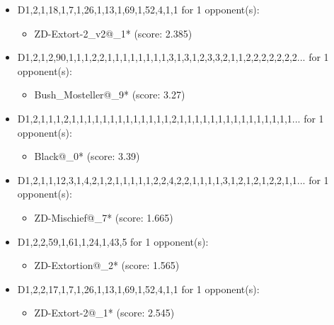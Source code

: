 \begin{appendices}
\begin{itemize}
    \item D1,2,1,18,1,7,1,26,1,13,1,69,1,52,4,1,1 for 1 opponent(s):
    \begin{multicols}{3}
         \begin{itemize}
            \item ZD-Extort-2\_v2@\_1* (score: 2.385)
        \end{itemize}
     \end{multicols}
     
    \item D1,2,1,2,90,1,1,1,2,2,1,1,1,1,1,1,1,1,3,1,3,1,2,3,3,2,1,1,2,2,2,2,2,2,2... for 1 opponent(s):
    \begin{multicols}{3}
         \begin{itemize}
            \item Bush\_Mosteller@\_9* (score: 3.27)
        \end{itemize}
     \end{multicols}
     
    \item D1,2,1,1,1,2,1,1,1,1,1,1,1,1,1,1,1,1,1,2,1,1,1,1,1,1,1,1,1,1,1,1,1,1,1... for 1 opponent(s):
    \begin{multicols}{3}
         \begin{itemize}
            \item Black@\_0* (score: 3.39)
        \end{itemize}
     \end{multicols}
     
    \item D1,2,1,1,12,3,1,4,2,1,2,1,1,1,1,1,2,2,4,2,2,1,1,1,1,3,1,2,1,2,1,2,2,1,1... for 1 opponent(s):
    \begin{multicols}{3}
         \begin{itemize}
            \item ZD-Mischief@\_7* (score: 1.665)
        \end{itemize}
     \end{multicols}
     
    \item D1,2,2,59,1,61,1,24,1,43,5 for 1 opponent(s):
    \begin{multicols}{3}
         \begin{itemize}
            \item ZD-Extortion@\_2* (score: 1.565)
        \end{itemize}
     \end{multicols}
     
    \item D1,2,2,17,1,7,1,26,1,13,1,69,1,52,4,1,1 for 1 opponent(s):
    \begin{multicols}{3}
         \begin{itemize}
            \item ZD-Extort-2@\_1* (score: 2.545)
        \end{itemize}
     \end{multicols}
     

\end{itemize}
\end{appendices}
